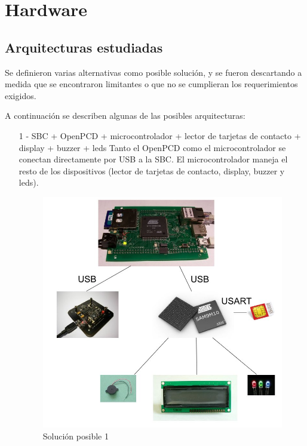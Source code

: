 \chapter{Hardware}

\section{Arquitecturas estudiadas}
Se definieron varias alternativas como posible solución, y se fueron descartando a medida que se encontraron limitantes o que no se cumplieran los requerimientos exigidos.

A continuación se describen algunas de las posibles arquitecturas:

\begin{itemize}
\item[1 -] SBC + OpenPCD + microcontrolador + lector de tarjetas de contacto + display + buzzer + leds
Tanto el OpenPCD como el microcontrolador se conectan directamente por USB a la SBC. El microcontrolador maneja el resto de los dispositivos (lector de tarjetas de contacto, display, buzzer y leds).

\begin{figure}[H]
\centering
  \begin{center}
  \includegraphics[scale=.25]{Imagenes/1.jpg} 
  \end{center}
  \caption{Solución posible 1}\label{Fig:HW} 
\end{figure}


\end{itemize}
